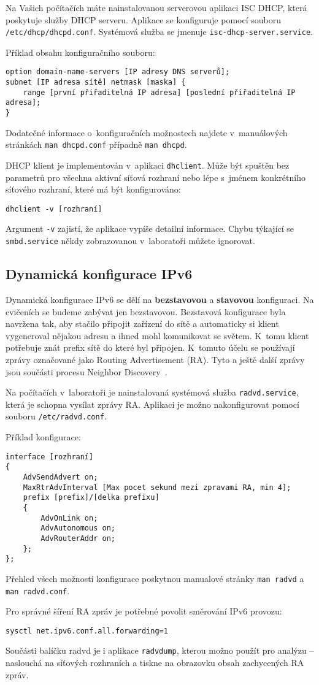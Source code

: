 Na Vašich počítačích máte nainstalovanou serverovou aplikaci ISC DHCP, která
poskytuje služby DHCP serveru. Aplikace se konfiguruje pomocí souboru
\verb_/etc/dhcp/dhcpd.conf_. Systémová služba se jmenuje
\texttt{isc-dhcp-server.service}.

Příklad obsahu konfiguračního souboru:
\begin{verbatim}
option domain-name-servers [IP adresy DNS serverů];
subnet [IP adresa sítě] netmask [maska] {
    range [první přiřaditelná IP adresa] [poslední přiřaditelná IP adresa];
}
\end{verbatim}
Dodatečné informace o~konfiguračních možnostech najdete v~manuálových stránkách
{\tt man dhcpd.conf} případně {\tt man dhcpd}.

DHCP klient je implementován v~aplikaci \texttt{dhclient}. Může být spuštěn bez
parametrů pro všechna aktivní síťová rozhraní nebo lépe s~jménem konkrétního
síťového rozhraní, které má být konfigurováno:
\begin{verbatim}
dhclient -v [rozhraní]
\end{verbatim}
Argument \texttt{-v} zajistí, že aplikace vypíše detailní informace.
Chybu týkající se {\tt smbd.service} někdy zobrazovanou v~laboratoři můžete ignorovat.

\subsection{Dynamická konfigurace IPv6}
\label{dynipv6}

Dynamická konfigurace IPv6 se dělí na {\bf bezstavovou} a {\bf stavovou}
konfiguraci. Na cvičeních se budeme zabývat jen bezstavovou. Bezstavová
konfigurace byla navržena tak, aby stačilo připojit zařízení do sítě a
automaticky si klient vygeneroval nějakou adresu a ihned mohl komunikovat se
světem. K~tomu klient potřebuje znát prefix sítě do které byl připojen.
K~tomuto účelu se používají zprávy označované jako Routing Advertisement (RA).
Tyto a ještě další zprávy jsou součásti procesu Neighbor Discovery~\cite{rfc4861}.

Na počítačích v~laboratoři je nainstalovaná systémová služba {\tt radvd.service},
která je schopna vysílat zprávy RA. Aplikaci je možno nakonfigurovat pomocí
souboru {\tt /etc/radvd.conf}.

Příklad konfigurace:
\begin{verbatim}
interface [rozhraní]
{
    AdvSendAdvert on;
    MaxRtrAdvInterval [Max pocet sekund mezi zpravami RA, min 4];
    prefix [prefix]/[delka prefixu]
    {
        AdvOnLink on;
        AdvAutonomous on;
        AdvRouterAddr on;
    };
};
\end{verbatim}
Přehled všech možností konfigurace poskytnou manualové stránky {\tt man radvd}
a {\tt man radvd.conf}.

Pro správné šíření RA zpráv je potřebné povolit směrování IPv6 provozu:
\begin{verbatim}
sysctl net.ipv6.conf.all.forwarding=1
\end{verbatim}

Součásti balíčku radvd je i aplikace {\tt radvdump}, kterou možno použít pro
analýzu -- naslouchá na síťových rozhraních a tiskne na obrazovku obsah
zachycených RA zpráv.
